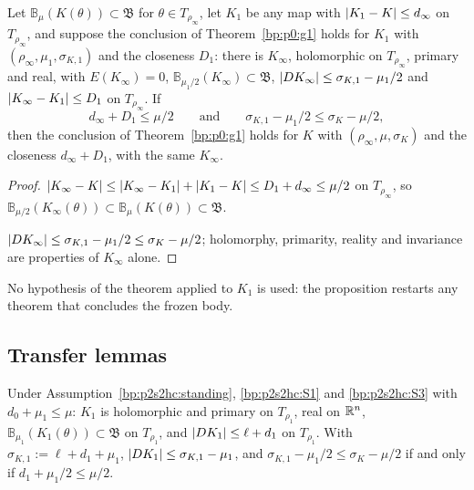 \begin{proposition}[Restart]\label{bp:p2s2hc:restart}
Let $\mathbb B_\mu(K(\theta))\subset\mathfrak B$ for $\theta\in T_{\rho_\infty}$, let $K_1$ be any map with $\lvert K_1-K\rvert\le d_\infty$ on $T_{\rho_\infty}$, and suppose the
conclusion of Theorem~\ref{bp:p0:g1} holds for $K_1$ with $(\rho_\infty,\mu_1,\sigma_{K,1})$ and the closeness $D_1$: there is $K_\infty$, holomorphic on
$T_{\rho_\infty}$, primary and real, with $E(K_\infty)=0$, $\mathbb B_{\mu_1/2}(K_\infty)\subset\mathfrak B$, $\lvert DK_\infty\rvert\le\sigma_{K,1}-\mu_1/2$ and $\lvert K_\infty-K_1\rvert\le D_1$ on
$T_{\rho_\infty}$. If
\[
d_\infty+D_1\le\mu/2\qquad\text{and}\qquad\sigma_{K,1}-\mu_1/2\le\sigma_K-\mu/2,
\]
then the conclusion of Theorem~\ref{bp:p0:g1} holds for $K$ with $(\rho_\infty,\mu,\sigma_K)$ and the closeness $d_\infty+D_1$, with the same $K_\infty$.
\end{proposition}

\begin{proof}
\label{step:p2s2hc:rs-ball}
$\lvert K_\infty-K\rvert\le\lvert K_\infty-K_1\rvert+\lvert K_1-K\rvert\le D_1+d_\infty\le\mu/2$ on $T_{\rho_\infty}$, so $\mathbb B_{\mu/2}(K_\infty(\theta))\subset\mathbb B_\mu(K(\theta))\subset\mathfrak B$.

\label{step:p2s2hc:rs-rest}
$\lvert DK_\infty\rvert\le\sigma_{K,1}-\mu_1/2\le\sigma_K-\mu/2$; holomorphy, primarity, reality and invariance are properties of $K_\infty$ alone.
\end{proof}

No hypothesis of the theorem applied to $K_1$ is used: the proposition restarts any theorem that concludes the frozen body.

\subsection{Transfer lemmas}\label{bp:p2s2hc:sec-transfer}

\begin{lemma}\label{bp:p2s2hc:struct}
Under Assumption~\ref{bp:p2s2hc:standing}, \ref{bp:p2s2hc:S1} and \ref{bp:p2s2hc:S3} with $d_0+\mu_1\le\mu$: $K_1$ is holomorphic and primary on $T_{\rho_1}$, real
on $\mathbb{R}^n$, $\mathbb B_{\mu_1}(K_1(\theta))\subset\mathfrak B$ on $T_{\rho_1}$, and $\lvert DK_1\rvert\le\ell+d_1$ on $T_{\rho_1}$. With $\sigma_{K,1}:=\ell+d_1+\mu_1$,
$\lvert DK_1\rvert\le\sigma_{K,1}-\mu_1$, and $\sigma_{K,1}-\mu_1/2\le\sigma_K-\mu/2$ if and only if $d_1+\mu_1/2\le\mu/2$.
\end{lemma}

